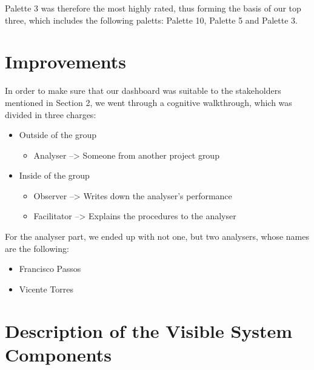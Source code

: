 Palette 3 was therefore the most highly rated, thus 
forming the basis of our top three, which includes the 
following paletts: Palette 10, Palette 5 and Palette 3.
\begin{figure}[H]
    \centerline{%
    \hfill
    \hfill
    }
\end{figure} 
\section{Improvements}
In order to make sure that our dashboard was suitable 
to the stakeholders mentioned in Section 2, we went 
through a cognitive walkthrough, which was divided in 
three charges: 
\begin{itemize}
    \item Outside of the group
    \begin{itemize}
    \item Analyser --> Someone from another project group 
    \end{itemize}
    \item Inside of the group
    \begin{itemize}
    \item Observer --> Writes down the analyser's performance
    \item Facilitator --> Explains the procedures to the 
    analyser
    \end{itemize}
\end{itemize}
For the analyser part, we ended up with not one, but two 
analysers, whose names are the following:
\begin{itemize}
    \item Francisco Passos
    \item Vicente Torres
\end{itemize}

\section{Description of the Visible System Components}
